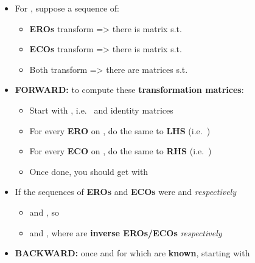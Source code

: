 \begin{itemize}

\item
  For , suppose a sequence of:

  \begin{itemize}
  
  \item
    \textbf{EROs} transform
     =\textgreater{}
    there is matrix  s.t. 
  \item
    \textbf{ECOs} transform
     =\textgreater{}
    there is matrix  s.t. 
  \item
    Both transform
    =\textgreater{} there are matrices  s.t. 
  \end{itemize}
\item
  \textbf{FORWARD:} to compute these \textbf{transformation matrices}:

  \begin{itemize}
  
  \item
    Start with \iMbox{[I_{m} \ | \ A \ | \ I_{n}]}, i.e.~ and
    identity matrices
  \item
    For every \textbf{ERO} on , do the same to \textbf{LHS}
    (i.e.~)
  \item
    For every \textbf{ECO} on , do the same to \textbf{RHS}
    (i.e.~)
  \item
    Once done, you should get
    \iMbox{\ds [I_{m} \ | \ A \ | \ I_{n}] \rightsquigarrow [R \ | \ A' \ | \ C]}
    with 
  \end{itemize}
\item
  If the sequences of \textbf{EROs} and \textbf{ECOs} were
   and
   \emph{respectively}

  \begin{itemize}
  
  \item
     and
    , so
  \item
     and
    , where
     are \textbf{inverse EROs/ECOs}
    \emph{respectively}
  \end{itemize}
\item
  \textbf{BACKWARD:} once  and
   for which  are
  \textbf{known}, starting with \iMbox{[I_{m} \ | \ A \ | \ I_{n}]}


\end{itemize}
